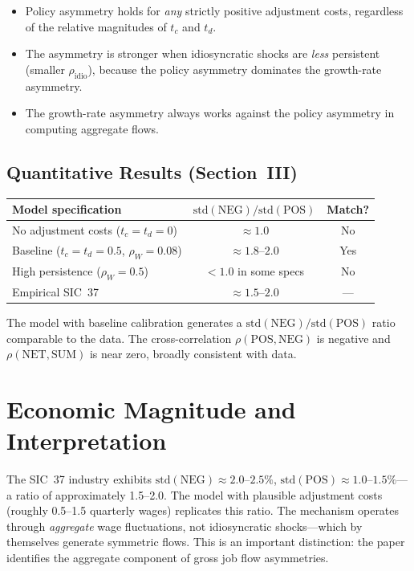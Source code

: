 \begin{itemize}
  \item Policy asymmetry holds for \emph{any} strictly positive adjustment
    costs, regardless of the relative magnitudes of $t_c$ and $t_d$.
  \item The asymmetry is stronger when idiosyncratic shocks are \emph{less}
    persistent (smaller $\rho_\text{idio}$), because the policy asymmetry
    dominates the growth-rate asymmetry.
  \item The growth-rate asymmetry always works against the policy asymmetry
    in computing aggregate flows.
\end{itemize}

\subsection*{Quantitative Results (Section~III)}

\begin{center}
\begin{tabular}{lcc}
\toprule
\textbf{Model specification} &
  $\text{std}(\text{NEG})/\text{std}(\text{POS})$ &
  \textbf{Match}? \\
\midrule
No adjustment costs ($t_c=t_d=0$) & $\approx 1.0$ & No \\
Baseline ($t_c=t_d=0.5$, $\rho_W=0.08$) & $\approx 1.8$--$2.0$ & Yes \\
High persistence ($\rho_W=0.5$) & $<1.0$ in some specs & No \\
Empirical SIC~37 & $\approx 1.5$--$2.0$ & --- \\
\bottomrule
\end{tabular}
\end{center}

The model with baseline calibration generates a $\text{std}(\text{NEG})/
\text{std}(\text{POS})$ ratio comparable to the data. The cross-correlation
$\rho(\text{POS},\text{NEG})$ is negative and $\rho(\text{NET},\text{SUM})$
is near zero, broadly consistent with data.

\section{Economic Magnitude and Interpretation}

The SIC~37 industry exhibits $\text{std}(\text{NEG})\approx 2.0$--$2.5\%$,
$\text{std}(\text{POS})\approx 1.0$--$1.5\%$---a ratio of approximately
1.5--2.0. The model with plausible adjustment costs (roughly 0.5--1.5
quarterly wages) replicates this ratio. The mechanism operates through
\emph{aggregate} wage fluctuations, not idiosyncratic shocks---which by
themselves generate symmetric flows. This is an important distinction: the
paper identifies the aggregate component of gross job flow asymmetries.


